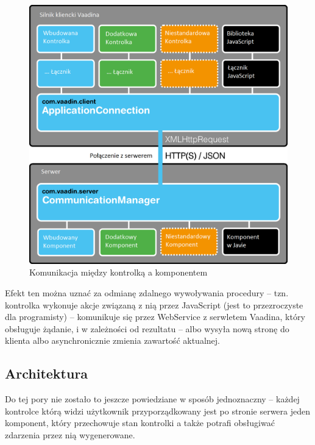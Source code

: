 \begin{figure} [H]
    \begin{center}
	\includegraphics[scale=.3]{img/client.png}
	\caption{Komunikacja między kontrolką a komponentem}
	\label{architekturaVaadin}
    \end{center}
\end{figure}

Efekt ten można uznać za odmianę zdalnego wywoływania procedury – tzn. kontrolka wykonuje akcje związaną z nią przez JavaScript (jest to przezroczyste dla programisty) – komunikuje się przez WebService z serwletem Vaadina, który obsługuje żądanie, i w zależności od rezultatu – albo wysyła nową stronę do klienta albo asynchronicznie zmienia zawartość aktualnej.

\subsection{Architektura}
Do tej pory nie zostało to jeszcze powiedziane w sposób jednoznaczny – każdej kontrolce którą widzi użytkownik przyporządkowany jest po stronie serwera jeden komponent, który przechowuje stan kontrolki a także potrafi obsługiwać zdarzenia przez nią wygenerowane. 


